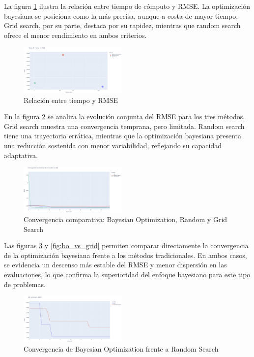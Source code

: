 \documentclass[twocolumn,10pt]{article}
\begin{document}
La figura \ref{fig:tradeoff} ilustra la relación entre tiempo de cómputo y RMSE. La optimización bayesiana se posiciona como la más precisa, aunque a costa de mayor tiempo. Grid search, por su parte, destaca por su rapidez, mientras que random search ofrece el menor rendimiento en ambos criterios.

\begin{figure}[H]
\centering
\includegraphics[width=0.47\textwidth]{fig_tradeoff.png}
\caption{Relación entre tiempo y RMSE}
\label{fig:tradeoff}
\end{figure}

En la figura \ref{fig:bo_vs_all} se analiza la evolución conjunta del RMSE para los tres métodos. Grid search muestra una convergencia temprana, pero limitada. Random search tiene una trayectoria errática, mientras que la optimización bayesiana presenta una reducción sostenida con menor variabilidad, reflejando su capacidad adaptativa.

\begin{figure}[H]
\centering
\includegraphics[width=0.47\textwidth]{fig_bo_vs_random_vs_grid.png}
\caption{Convergencia comparativa: Bayesian Optimization, Random y Grid Search}
\label{fig:bo_vs_all}
\end{figure}

Las figuras \ref{fig:bo_vs_random} y \ref{fig:bo_vs_grid} permiten comparar directamente la convergencia de la optimización bayesiana frente a los métodos tradicionales. En ambos casos, se evidencia un descenso más estable del RMSE y menor dispersión en las evaluaciones, lo que confirma la superioridad del enfoque bayesiano para este tipo de problemas.

\begin{figure}[H]
\centering
\includegraphics[width=0.47\textwidth]{fig_bo_vs_random.png}
\caption{Convergencia de Bayesian Optimization frente a Random Search}
\label{fig:bo_vs_random}
\end{figure}
\end{document}
